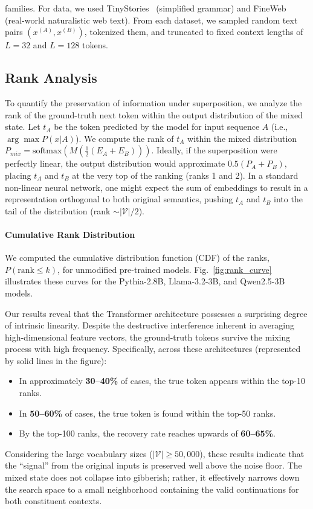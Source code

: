 \documentclass{article}
\theoremstyle{plain}
\theoremstyle{definition}
\theoremstyle{remark}
\begin{document}
families. For data, we used TinyStories~\cite{eldan2023tinystories} (simplified grammar) and FineWeb~\cite{penedo2024fineweb} (real-world naturalistic web text). From each dataset, we sampled random text pairs $(x^{(A)}, x^{(B)})$, tokenized them, and truncated to fixed context lengths of $L=32$ and $L=128$ tokens.

\subsection{Rank Analysis}
\label{subsec:rank_analysis}

To quantify the preservation of information under superposition, we analyze the rank of the ground-truth next token within the output distribution of the mixed state. Let $t_A$ be the token predicted by the model for input sequence $A$ (i.e., $\arg\max P(x|A)$). We compute the rank of $t_A$ within the mixed distribution $P_{mix} = \text{softmax}(M( \frac{1}{2}(E_A + E_B) ))$. Ideally, if the superposition were perfectly linear, the output distribution would approximate $0.5(P_A + P_B)$, placing $t_A$ and $t_B$ at the very top of the ranking (ranks 1 and 2). In a standard non-linear neural network, one might expect the sum of embeddings to result in a representation orthogonal to both original semantics, pushing $t_A$ and $t_B$ into the tail of the distribution (rank $\sim |\mathcal{V}|/2$).

\paragraph{Cumulative Rank Distribution}
We computed the cumulative distribution function (CDF) of the ranks, $P(\text{rank} \le k)$, for unmodified pre-trained models. Fig.~\ref{fig:rank_curve} illustrates these curves for the Pythia-2.8B, Llama-3.2-3B, and Qwen2.5-3B models.

Our results reveal that the Transformer architecture possesses a surprising degree of intrinsic linearity. Despite the destructive interference inherent in averaging high-dimensional feature vectors, the ground-truth tokens survive the mixing process with high frequency. Specifically, across these architectures (represented by solid lines in the figure):
\begin{itemize}
    \item In approximately \textbf{30--40\%} of cases, the true token appears within the top-10 ranks.
    \item In \textbf{50--60\%} of cases, the true token is found within the top-50 ranks.
    \item By the top-100 ranks, the recovery rate reaches upwards of \textbf{60--65\%}.
\end{itemize}
Considering the large vocabulary sizes ($|\mathcal{V}| \ge 50,000$), these results indicate that the ``signal'' from the original inputs is preserved well above the noise floor. The mixed state does not collapse into gibberish; rather, it effectively narrows down the search space to a small neighborhood containing the valid continuations for both constituent contexts.
\end{document}
